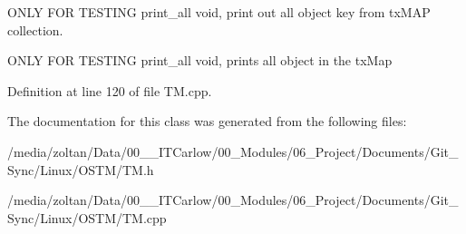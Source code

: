 O\+N\+LY F\+OR T\+E\+S\+T\+I\+NG print\+\_\+all void, print out all object key from tx\+M\+AP collection. 

O\+N\+LY F\+OR T\+E\+S\+T\+I\+NG print\+\_\+all void, prints all object in the tx\+Map 

Definition at line 120 of file T\+M.\+cpp.



The documentation for this class was generated from the following files\+:\begin{DoxyCompactItemize}
\item 
/media/zoltan/\+Data/00\+\_\+\_\+\+I\+T\+Carlow/00\+\_\+\+Modules/06\+\_\+\+Project/\+Documents/\+Git\+\_\+\+Sync/\+Linux/\+O\+S\+T\+M/T\+M.\+h\item 
/media/zoltan/\+Data/00\+\_\+\_\+\+I\+T\+Carlow/00\+\_\+\+Modules/06\+\_\+\+Project/\+Documents/\+Git\+\_\+\+Sync/\+Linux/\+O\+S\+T\+M/T\+M.\+cpp\end{DoxyCompactItemize}
